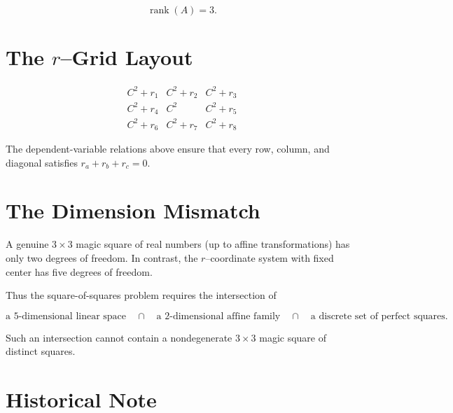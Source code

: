 \documentclass[12pt]{article}
\begin{document}
\[
\operatorname{rank}(A)=3.
\]




\section*{The $r$--Grid Layout}



\[
\begin{matrix}
C^2+r_1 & C^2+r_2 & C^2+r_3 \\
C^2+r_4 & C^2     & C^2+r_5 \\
C^2+r_6 & C^2+r_7 & C^2+r_8
\end{matrix}
\]



The dependent-variable relations above ensure that every row, column, and
diagonal satisfies $r_a+r_b+r_c=0$.


\section*{The Dimension Mismatch}

A genuine $3\times 3$ magic square of real numbers (up to affine
transformations) has only two degrees of freedom.  
In contrast, the $r$--coordinate system with fixed center has five degrees of
freedom.

Thus the square-of-squares problem requires the intersection of


\[
\text{a $5$-dimensional linear space}
\quad\cap\quad
\text{a $2$-dimensional affine family}
\quad\cap\quad
\text{a discrete set of perfect squares}.
\]


Such an intersection cannot contain a nondegenerate $3\times 3$ magic square
of distinct squares.


\section*{Historical Note}
\end{document}
